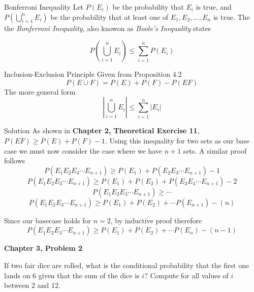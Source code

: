 \documentclass{article}
\begin{document}
\begin{spacing}{1.1}
\begin{homeworkProblem}
  \begin{homeworkSection}{Bonferroni Inequality}
    Let $P( E_i)$ be the probability that $E_i$ is true, and $P\left( \bigcup\limits_{i = 1}^{n}{ E_i}\right)$ be the probability 
    that at least one of $E_1, E_2, \dots, E_n$ is true.  The the \emph{Bonferroni Inequality}, also knowon as \emph{Boole's Inequality} states

    \[P\left( \bigcup\limits_{i = 1}^{n}{ E_i}\right) \le \sum\limits_{i = 1}^{n}{ P( E_i)}\]
  \end{homeworkSection}	

  \begin{homeworkSection}{Inclusion-Exclusion Principle}
    Given from Proposition 4.2
      \[P( E \cup F) = P( E) + P( F) - P( EF)\]
    The more general form
      \[\left|\bigcup\limits_{i = 1}^{n}{ E_i}\right| \le \sum\limits_{i = 1}^{n}{ \left|E_i\right|}\]
  \end{homeworkSection}

	\begin{homeworkSection}{Solution}
    As shown in {\bf Chapter 2, Theoretical Exercise 11}, $P( EF) \ge P( E) + P( F) - 1$. 
    Using this inequality for two sets as our base case we must now consider the case where
    we have $n + 1$ sets.  A similar proof follows
      \[P( E_1 E_2 E_3 \cdots E_{n + 1}) \ge P( E_1) + P(E_2 E_3 \cdots E_{n + 1}) - 1\]
      \[P( E_1 E_2 E_3 \cdots E_{n + 1}) \ge P( E_1) + P( E_2) + P(E_3 E_4 \cdots E_{n + 1}) - 2\]
      \[P( E_1 E_2 E_3 \cdots E_{n + 1}) \ge \cdots\]
      \[P( E_1 E_2 E_3 \cdots E_{n + 1}) \ge P( E_1) + P( E_2) + \cdots P( E_{n + 1}) - (n)\]

    Since our basecase holds for $n = 2$, by inductive proof therefore 
      \[P( E_1 E_2 E_3 \cdots E_{n + 1}) \ge P( E_1) + P( E_2) + \cdots P( E_{n}) - (n - 1)\]

	\end{homeworkSection}
\end{homeworkProblem}

\newpage
\begin{homeworkProblem}
  {\bf Chapter 3, Problem 2	}
  
  If two fair dice are rolled, what is the conditional probability that the first one lands 
  on 6 given that the sum of the dice is $i$? Compute for all values of $i$ between 2 and 12.


\end{homeworkProblem}
\end{spacing}
\end{document}

